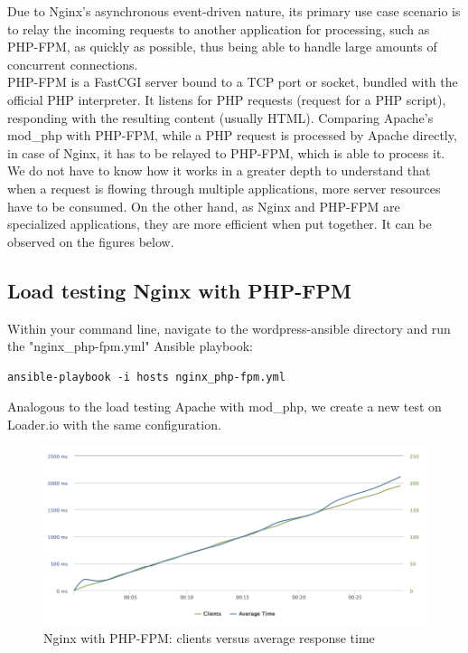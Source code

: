 Due to Nginx's asynchronous event-driven nature, its primary use case scenario is to relay the incoming requests to another application for processing, such as PHP-FPM, as quickly as possible, thus being able to handle large amounts of concurrent connections. \\

PHP-FPM is a FastCGI server bound to a TCP port or socket, bundled with the official PHP interpreter. It listens for PHP requests (request for a PHP script), responding with the resulting content (usually HTML). Comparing Apache's mod\_php with PHP-FPM, while a PHP request is processed by Apache directly, in case of Nginx, it has to be relayed to PHP-FPM, which is able to process it. We do not have to know how it works in a greater depth to understand that when a request is flowing through multiple applications, more server resources have to be consumed. On the other hand, as Nginx and PHP-FPM are specialized applications, they are more efficient when put together. It can be observed on the figures below.

\subsection{Load testing Nginx with PHP-FPM}

Within your command line, navigate to the wordpress-ansible directory and run the "nginx\_php-fpm.yml" Ansible playbook:

\begin{lstlisting}
ansible-playbook -i hosts nginx_php-fpm.yml
\end{lstlisting}

Analogous to the load testing Apache with mod\_php, we create a new test on Loader.io with the same configuration. \cite{Loader.io:nginx_php-fpm}

\begin{figure}[H]
\begin{center}
\includegraphics[scale=0.5]{figures/Nginx_PHP-FPM.png}
\caption{Nginx with PHP-FPM: clients versus average response time}
\label{fig:nginx_php-fpm}
\end{center}
\end{figure}

